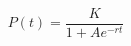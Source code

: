 \documentclass[preview]{standalone}
\begin{document}
\begin{align*}
P(t) = \dfrac{K}{1 + Ae^{-rt}}
\end{align*}
\end{document}
